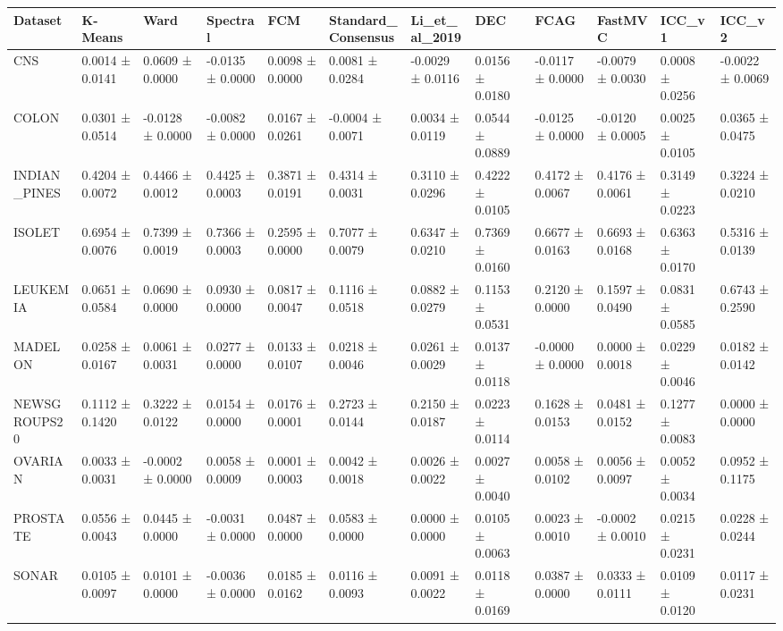\begin{tabular}{llllllllllll}
\toprule
Dataset & K-Means & Ward & Spectral & FCM & Standard_Consensus & Li_et_al_2019 & DEC & FCAG & FastMVC & ICC_v1 & ICC_v2 \\
\midrule
CNS & 0.0014 ± 0.0141 & 0.0609 ± 0.0000 & -0.0135 ± 0.0000 & 0.0098 ± 0.0000 & 0.0081 ± 0.0284 & -0.0029 ± 0.0116 & 0.0156 ± 0.0180 & -0.0117 ± 0.0000 & -0.0079 ± 0.0030 & 0.0008 ± 0.0256 & -0.0022 ± 0.0069 \\
COLON & 0.0301 ± 0.0514 & -0.0128 ± 0.0000 & -0.0082 ± 0.0000 & 0.0167 ± 0.0261 & -0.0004 ± 0.0071 & 0.0034 ± 0.0119 & 0.0544 ± 0.0889 & -0.0125 ± 0.0000 & -0.0120 ± 0.0005 & 0.0025 ± 0.0105 & 0.0365 ± 0.0475 \\
INDIAN_PINES & 0.4204 ± 0.0072 & 0.4466 ± 0.0012 & 0.4425 ± 0.0003 & 0.3871 ± 0.0191 & 0.4314 ± 0.0031 & 0.3110 ± 0.0296 & 0.4222 ± 0.0105 & 0.4172 ± 0.0067 & 0.4176 ± 0.0061 & 0.3149 ± 0.0223 & 0.3224 ± 0.0210 \\
ISOLET & 0.6954 ± 0.0076 & 0.7399 ± 0.0019 & 0.7366 ± 0.0003 & 0.2595 ± 0.0000 & 0.7077 ± 0.0079 & 0.6347 ± 0.0210 & 0.7369 ± 0.0160 & 0.6677 ± 0.0163 & 0.6693 ± 0.0168 & 0.6363 ± 0.0170 & 0.5316 ± 0.0139 \\
LEUKEMIA & 0.0651 ± 0.0584 & 0.0690 ± 0.0000 & 0.0930 ± 0.0000 & 0.0817 ± 0.0047 & 0.1116 ± 0.0518 & 0.0882 ± 0.0279 & 0.1153 ± 0.0531 & 0.2120 ± 0.0000 & 0.1597 ± 0.0490 & 0.0831 ± 0.0585 & 0.6743 ± 0.2590 \\
MADELON & 0.0258 ± 0.0167 & 0.0061 ± 0.0031 & 0.0277 ± 0.0000 & 0.0133 ± 0.0107 & 0.0218 ± 0.0046 & 0.0261 ± 0.0029 & 0.0137 ± 0.0118 & -0.0000 ± 0.0000 & 0.0000 ± 0.0018 & 0.0229 ± 0.0046 & 0.0182 ± 0.0142 \\
NEWSGROUPS20 & 0.1112 ± 0.1420 & 0.3222 ± 0.0122 & 0.0154 ± 0.0000 & 0.0176 ± 0.0001 & 0.2723 ± 0.0144 & 0.2150 ± 0.0187 & 0.0223 ± 0.0114 & 0.1628 ± 0.0153 & 0.0481 ± 0.0152 & 0.1277 ± 0.0083 & 0.0000 ± 0.0000 \\
OVARIAN & 0.0033 ± 0.0031 & -0.0002 ± 0.0000 & 0.0058 ± 0.0009 & 0.0001 ± 0.0003 & 0.0042 ± 0.0018 & 0.0026 ± 0.0022 & 0.0027 ± 0.0040 & 0.0058 ± 0.0102 & 0.0056 ± 0.0097 & 0.0052 ± 0.0034 & 0.0952 ± 0.1175 \\
PROSTATE & 0.0556 ± 0.0043 & 0.0445 ± 0.0000 & -0.0031 ± 0.0000 & 0.0487 ± 0.0000 & 0.0583 ± 0.0000 & 0.0000 ± 0.0000 & 0.0105 ± 0.0063 & 0.0023 ± 0.0010 & -0.0002 ± 0.0010 & 0.0215 ± 0.0231 & 0.0228 ± 0.0244 \\
SONAR & 0.0105 ± 0.0097 & 0.0101 ± 0.0000 & -0.0036 ± 0.0000 & 0.0185 ± 0.0162 & 0.0116 ± 0.0093 & 0.0091 ± 0.0022 & 0.0118 ± 0.0169 & 0.0387 ± 0.0000 & 0.0333 ± 0.0111 & 0.0109 ± 0.0120 & 0.0117 ± 0.0231 \\

\end{tabular}
